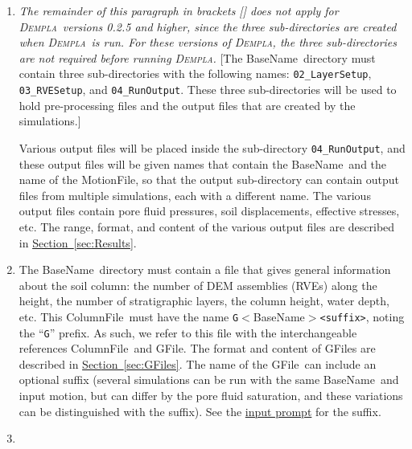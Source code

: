 \documentclass[letterpaper,11pt]{article}
\newcommand{\Dempla}{\textsc{Dempla}}
\newcommand{\BaseName}{\textsf{BaseName}}
\newcommand{\ColumnFile}{\textsf{ColumnFile}}
\newcommand{\GFile}{\textsf{GFile}}
\newcommand{\MotionFile}{\textsf{MotionFile}}
\begin{document}
    \begin{enumerate}
      \item\label{item:BaseNameDirectory}
        \emph{The remainder of this paragraph
        	in brackets [] does not apply for
        \Dempla\ versions 0.2.5 and higher,
        since the three sub-directories are created
        when \Dempla\ is run.
        For these versions of \Dempla, the three sub-directories
        are not required before running \Dempla.}
        [The \BaseName\ directory must contain three sub-directories
        with the following names:
        \texttt{02\_LayerSetup}, \texttt{03\_RVESetup},
        and \texttt{04\_RunOutput}.
        These three sub-directories will be used to hold
        pre-processing files and the output files that are
        created by the simulations.]
        \par
        \rule{0ex}{3ex}Various output files will be placed inside the
        sub-directory \texttt{04\_RunOutput}, and these
        output files will be given names that contain
        the \BaseName\ and the name of the \MotionFile,
        so that the output sub-directory can contain
        output files
        from multiple simulations, each with a different
        name.
        The various output files contain pore fluid pressures,
        soil displacements, effective stresses, etc.
        The range, format, and content of the various output files
        are described in
        \hyperref[sec:Results]{Section~\ref*{sec:Results}}.
      \item\label{item:BaseName2}
        The \BaseName\ directory must contain a file that gives
        general information about the soil column:
        the number of DEM assemblies (RVEs) along the height,
        the number of stratigraphic layers, the column height,
        water depth, etc.
        This \ColumnFile\ must have the name
        \texttt{G}$<$\BaseName$>$\texttt{<suffix>}, noting the
        ``\texttt{G}'' prefix.
        As such, we refer to this file with the interchangeable
        references \ColumnFile\ and \GFile.
        The format and content of \GFile s are described
        in \hyperref[sec:GFiles]{Section~\ref*{sec:GFiles}}.
        The name of the \GFile\ can include an optional suffix
        (several simulations can be run with the same
        \BaseName\ and input motion, but can differ by the
        pore fluid saturation, and these variations can be
        distinguished with the suffix).
        See the \hyperref[par:input]{input prompt} for
        the suffix.
      \item\label{sec:Lfiles0}

\end{enumerate}
\end{document}
